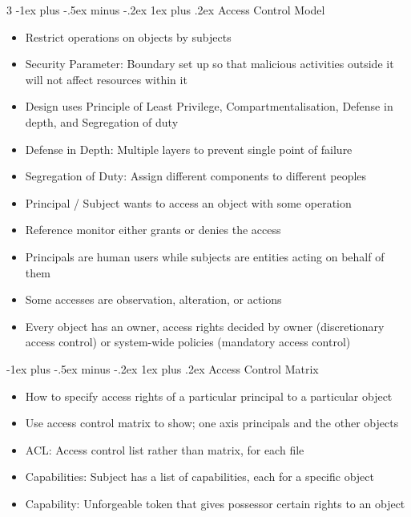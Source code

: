 \documentclass[10pt, landscape]{article}
\makeatletter
\renewcommand{\subsection}{\@startsection{subsection}{3}{0mm}%
                                {-1ex plus -.5ex minus -.2ex}%
                                {1ex plus .2ex}%
                                {\normalfont\small\bfseries}}%
\makeatother
\begin{document}
\begin{multicols*}{3}
\subsection{Access Control Model}
\begin{itemize}
    \item Restrict operations on objects by subjects
    \item Security Parameter: Boundary set up so that malicious activities outside it will not affect resources within it
    \item Design uses Principle of Least Privilege, Compartmentalisation, Defense in depth, and Segregation of duty
    \item Defense in Depth: Multiple layers to prevent single point of failure
    \item Segregation of Duty: Assign different components to different peoples
    \item Principal / Subject wants to access an object with some operation
    \item Reference monitor either grants or denies the access
    \item Principals are human users while subjects are entities acting on behalf of them
    \item Some accesses are observation, alteration, or actions
    \item Every object has an owner, access rights decided by owner (discretionary access control) or system-wide policies (mandatory access control)
\end{itemize}

\subsection{Access Control Matrix}
\begin{itemize}
    \item How to specify access rights of a particular principal to a particular object
    \item Use access control matrix to show; one axis principals and the other objects
    \item ACL: Access control list rather than matrix, for each file
    \item Capabilities: Subject has a list of capabilities, each for a specific object
    \item Capability: Unforgeable token that gives possessor certain rights to an object
\end{itemize}


\end{multicols*}
\end{document}
